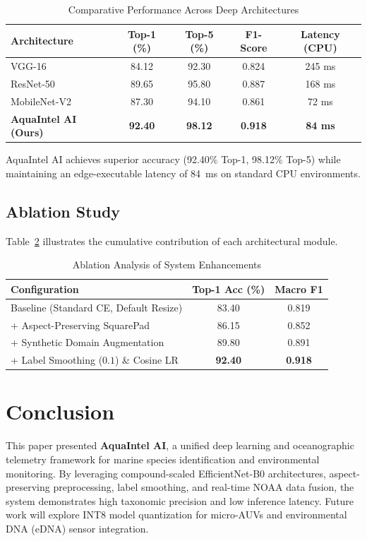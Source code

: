 \documentclass[conference]{IEEEtran}
\begin{document}
\begin{table}[htbp]
\caption{Comparative Performance Across Deep Architectures}
\begin{center}
\begin{tabular}{lcccc}
\toprule
\textbf{Architecture} & \textbf{Top-1 (\%)} & \textbf{Top-5 (\%)} & \textbf{F1-Score} & \textbf{Latency (CPU)} \\
\midrule
VGG-16 & 84.12 & 92.30 & 0.824 & 245 ms \\
ResNet-50 & 89.65 & 95.80 & 0.887 & 168 ms \\
MobileNet-V2 & 87.30 & 94.10 & 0.861 & 72 ms \\
\textbf{AquaIntel AI (Ours)} & \textbf{92.40} & \textbf{98.12} & \textbf{0.918} & \textbf{84 ms} \\
\bottomrule
\end{tabular}
\label{tab:benchmark}
\end{center}
\end{table}

AquaIntel AI achieves superior accuracy (92.40\% Top-1, 98.12\% Top-5) while maintaining an edge-executable latency of 84~ms on standard CPU environments.

\subsection{Ablation Study}
Table~\ref{tab:ablation} illustrates the cumulative contribution of each architectural module.

\begin{table}[htbp]
\caption{Ablation Analysis of System Enhancements}
\begin{center}
\begin{tabular}{lcc}
\toprule
\textbf{Configuration} & \textbf{Top-1 Acc (\%)} & \textbf{Macro F1} \\
\midrule
Baseline (Standard CE, Default Resize) & 83.40 & 0.819 \\
+ Aspect-Preserving SquarePad & 86.15 & 0.852 \\
+ Synthetic Domain Augmentation & 89.80 & 0.891 \\
+ Label Smoothing ($0.1$) \& Cosine LR & \textbf{92.40} & \textbf{0.918} \\
\bottomrule
\end{tabular}
\label{tab:ablation}
\end{center}
\end{table}

\section{Conclusion}
This paper presented \textbf{AquaIntel AI}, a unified deep learning and oceanographic telemetry framework for marine species identification and environmental monitoring. By leveraging compound-scaled EfficientNet-B0 architectures, aspect-preserving preprocessing, label smoothing, and real-time NOAA data fusion, the system demonstrates high taxonomic precision and low inference latency. Future work will explore INT8 model quantization for micro-AUVs and environmental DNA (eDNA) sensor integration.
\end{document}
